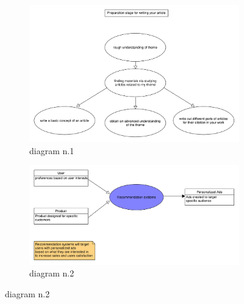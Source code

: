 \documentclass[10pt,twocolumn,twoside,english,a4paper]{article}
\begin{document}
\begin{figure}[h]
	\caption{UMLet diagrams}
	\label{fig:umletdiag}
	\begin{subfigure}[b]{0.5\textwidth}
		\centering
		\includegraphics[width=1\textwidth]{diagram_1.pdf}
		\caption{diagram n.1}
	\end{subfigure}
	\begin{subfigure}[b]{0.5\textwidth}
		\centering
		\includegraphics[width=1\textwidth]{diagram_2.pdf}
		\caption{diagram n.2}
	\end{subfigure}
\end{figure}



% 
\end{document}
